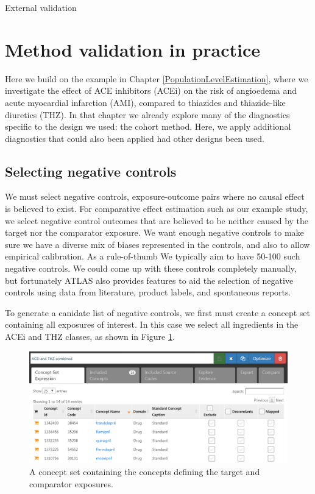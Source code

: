 \documentclass[11pt]{book}
\begin{document}
External validation

\section{Method validation in
practice}\label{method-validation-in-practice}

Here we build on the example in Chapter \ref{PopulationLevelEstimation},
where we investigate the effect of ACE inhibitors (ACEi) on the risk of
angioedema and acute myocardial infarction (AMI), compared to thiazides
and thiazide-like diuretics (THZ). In that chapter we already explore
many of the diagnostics specific to the design we used: the cohort
method. Here, we apply additional diagnostics that could also been
applied had other designs been used.

\subsection{Selecting negative
controls}\label{selecting-negative-controls}

We must select negative controls, exposure-outcome pairs where no causal
effect is believed to exist. For comparative effect estimation such as
our example study, we select negative control outcomes that are believed
to be neither caused by the target nor the comparator exposure. We want
enough negative controls to make sure we have a diverse mix of biases
represented in the controls, and also to allow empirical calibration. As
a rule-of-thumb We typically aim to have 50-100 such negative controls.
We could come up with these controls completely manually, but
fortunately ATLAS also provides features to aid the selection of
negative controls using data from literature, product labels, and
spontaneous reports.

To generate a canidate list of negative controls, we first must create a
concept set containing all exposures of interest. In this case we select
all ingredients in the ACEi and THZ classes, as shown in Figure
\ref{fig:exposuresConceptSet}.

\begin{figure}

{\centering \includegraphics[width=1\linewidth]{images/MethodValidity/exposuresConceptSet} 

}

\caption{A concept set containing the concepts defining the target and comparator exposures.}\label{fig:exposuresConceptSet}
\end{figure}
\end{document}
